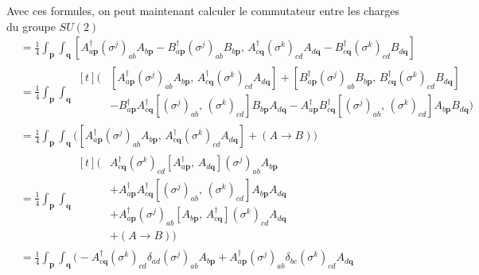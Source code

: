 \documentclass{article}
\numberwithin{equation}{section}
\begin{document}
Avec ces formules, on peut maintenant calculer le commutateur entre les charges du groupe $SU(2)$
\begingroup
\allowdisplaybreaks
\begin{align*}
        [Q^{j}, Q^{k}] &= \frac{1}{4}\int_{\mathbf{p}} \int_{\mathbf{q}} [A^{\dagger}_{a\mathbf{p}}(\sigma^{j})_{ab} A_{b \mathbf{p}} -  B^{\dagger}_{a \mathbf{p}} (\sigma^{j})_{ab}B_{b \mathbf{p}},\, 
        A^{\dagger}_{c\mathbf{q}}(\sigma^{k})_{cd} A_{d \mathbf{q}} -  B^{\dagger}_{c \mathbf{q}} (\sigma^{k})_{cd}B_{d \mathbf{q}}] \\
        &=  \frac{1}{4}\int_{\mathbf{p}} \int_{\mathbf{q}} 
\begin{aligned}[t]
        \big(&[A^{\dagger}_{a\mathbf{p}}(\sigma^{j})_{ab} A_{b \mathbf{p}} ,\, A^{\dagger}_{c\mathbf{q}}(\sigma^{k})_{cd} A_{d \mathbf{q}}] 
        +[B^{\dagger}_{a \mathbf{p}} (\sigma^{j})_{ab}B_{b \mathbf{p}},\,  B^{\dagger}_{c \mathbf{q}} (\sigma^{k})_{cd}B_{d \mathbf{q}}] \\
        &- B^{\dagger}_{a \mathbf{p}}A^{\dagger}_{c\mathbf{q}}[ (\sigma^{j})_{ab},\,(\sigma^{k})_{cd}] B_{b \mathbf{p}} A_{d \mathbf{q}}
        -A^{\dagger}_{a\mathbf{p}} B^{\dagger}_{c \mathbf{q}}[(\sigma^{j})_{ab},\,   (\sigma^{k})_{cd}] A_{b \mathbf{p}}B_{d \mathbf{q}}
        \big) 
\end{aligned} \\
&=  \frac{1}{4}\int_{\mathbf{p}} \int_{\mathbf{q}} \big([A^{\dagger}_{a\mathbf{p}}(\sigma^{j})_{ab} A_{b \mathbf{p}} ,\, A^{\dagger}_{c\mathbf{q}}(\sigma^{k})_{cd} A_{d \mathbf{q}}] 
+ (A \rightarrow  B)\big)  \\
&=  \frac{1}{4}\int_{\mathbf{p}} \int_{\mathbf{q}} 
\begin{aligned}[t]
\big(& A^{\dagger}_{c\mathbf{q}}(\sigma^{k})_{cd}[A^{\dagger}_{a\mathbf{p}},\, A_{d \mathbf{q}}] (\sigma^{j})_{ab} A_{b \mathbf{p}} \\
&+ A^{\dagger}_{a\mathbf{p}} A^{\dagger}_{c\mathbf{q}}[(\sigma^{j})_{ab},\,(\sigma^{k})_{cd}]  A_{b \mathbf{p}}  A_{d \mathbf{q}} \\
&+A^{\dagger}_{a\mathbf{p}}(\sigma^{j})_{ab} [A_{b \mathbf{p}} ,\, A^{\dagger}_{c\mathbf{q}}] (\sigma^{k})_{cd} A_{d \mathbf{q}}
\\
&+ (A \rightarrow  B)\big)  
\end{aligned}\\
&=  \frac{1}{4}\int_{\mathbf{p}} \int_{\mathbf{q}} 
\big( -A^{\dagger}_{c\mathbf{q}}(\sigma^{k})_{cd}  \delta_{ad}(\sigma^{j})_{ab} A_{b \mathbf{p}} 
+A^{\dagger}_{a\mathbf{p}}(\sigma^{j})_{ab}\delta_{bc}(\sigma^{k})_{cd} A_{d \mathbf{q}} 

\end{align*}
\end{document}
